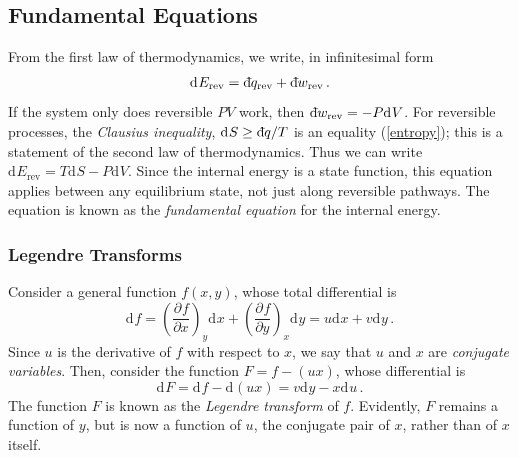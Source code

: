 \documentclass{article}
\theoremstyle{plain}\theoremheaderfont{\normalfont\bfseries}\theorembodyfont{\rmfamily}\theoremseparator{.}\newtheorem*{thm}{Theorem}\newtheorem*{law}{Law}\newtheorem*{pos}{Postulate}
\numberwithin{equation}{section}
\newcommand{\dbar}{\mathrm{d}\hspace*{-0.14em}\bar{}\hspace*{0.12em}}
\renewcommand{\d}[2][]{\mathrm{d}^{#1} #2}
\newcommand{\pdv}[3][]{\frac{\partial^{#1} #2}{{\partial #3}^{#1}}}
\begin{document}
    \subsection{Fundamental Equations}
    From the first law of thermodynamics, we write, in infinitesimal form
    \begin{equation}
        \d{E}_{\text{rev}}=\dbar q_{\text{rev}}+\dbar w_{\text{rev}}\,.
    \end{equation}
    If the system only does reversible \(PV\) work, then \(\dbar w_{\text{rev}}=-P\d{V}\). For reversible processes, the \textit{Clausius inequality}, \(\d{S}\ge\dbar q/T\) is an equality (\ref{entropy}); this is a statement of the second law of thermodynamics. Thus we can write \(\d{E}_{\text{rev}}=T\d{S}-P\d{V}\). Since the internal energy is a state function, this equation applies between any equilibrium state, not just along reversible pathways. The equation is known as the \textit{fundamental equation} for the internal energy.

    \subsubsection{Legendre Transforms}
    Consider a general function \(f(x,y)\), whose total differential is
    \begin{equation}
        \d{f}=\left(\pdv{f}{x}\right)_y\d{x}+\left(\pdv{f}{y}\right)_x\d{y}=u\d{x}+v\d{y}\,.
    \end{equation}
    Since \(u\) is the derivative of \(f\) with respect to \(x\), we say that \(u\) and \(x\) are \textit{conjugate variables}. Then, consider the function \(F=f-(ux)\), whose differential is
    \begin{equation}
        \d{F}=\d{f}-\d{(ux)}=v\d{y}-x\d{u}\,.
    \end{equation}
    The function \(F\) is known as the \textit{Legendre transform} of \(f\). Evidently, \(F\) remains a function of \(y\), but is now a function of \(u\), the conjugate pair of \(x\), rather than of \(x\) itself.
\end{document}
